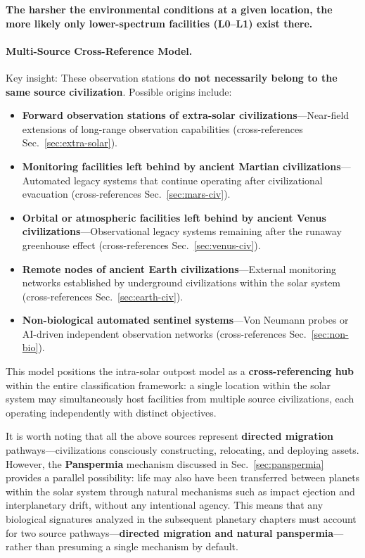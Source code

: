 \documentclass[aps,prd,twocolumn,superscriptaddress,nofootinbib]{revtex4-2}
\begin{document}
\textbf{The harsher the environmental conditions at a given location, the more likely only lower-spectrum facilities (L0--L1) exist there.}

\paragraph{Multi-Source Cross-Reference Model.}

Key insight: These observation stations \textbf{do not necessarily belong to the same source civilization}. Possible origins include:

\begin{itemize}
  \item \textbf{Forward observation stations of extra-solar civilizations}---Near-field extensions of long-range observation capabilities (cross-references Sec.~\ref{sec:extra-solar}).
  \item \textbf{Monitoring facilities left behind by ancient Martian civilizations}---Automated legacy systems that continue operating after civilizational evacuation (cross-references Sec.~\ref{sec:mars-civ}).
  \item \textbf{Orbital or atmospheric facilities left behind by ancient Venus civilizations}---Observational legacy systems remaining after the runaway greenhouse effect (cross-references Sec.~\ref{sec:venus-civ}).
  \item \textbf{Remote nodes of ancient Earth civilizations}---External monitoring networks established by underground civilizations within the solar system (cross-references Sec.~\ref{sec:earth-civ}).
  \item \textbf{Non-biological automated sentinel systems}---Von Neumann probes or AI-driven independent observation networks (cross-references Sec.~\ref{sec:non-bio}).
\end{itemize}

This model positions the intra-solar outpost model as a \textbf{cross-referencing hub} within the entire classification framework: a single location within the solar system may simultaneously host facilities from multiple source civilizations, each operating independently with distinct objectives.

It is worth noting that all the above sources represent \textbf{directed migration} pathways---civilizations consciously constructing, relocating, and deploying assets. However, the \textbf{Panspermia} mechanism discussed in Sec.~\ref{sec:panspermia} provides a parallel possibility: life may also have been transferred between planets within the solar system through natural mechanisms such as impact ejection and interplanetary drift, without any intentional agency. This means that any biological signatures analyzed in the subsequent planetary chapters must account for two source pathways---\textbf{directed migration and natural panspermia}---rather than presuming a single mechanism by default.
\end{document}
